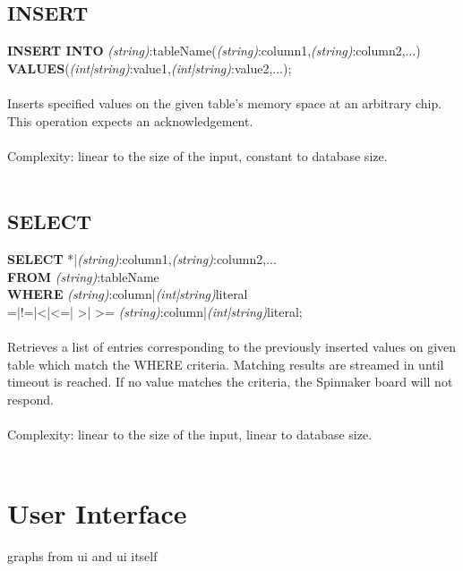 \subsection{INSERT}   
   
 \noindent
  {\large\textbf{INSERT INTO} \textit{(string)}:tableName(\textit{(string)}:column1,\textit{(string)}:column2,...)\\
  \textbf{VALUES}(\textit{(int|string)}:value1,\textit{(int|string)}:value2,...);}\\\\
\noindent
  Inserts specified values on the given table's memory space at an arbitrary chip. This operation expects an acknowledgement.\\\\
\noindent
   Complexity: linear to the size of the input, constant to database size.\\\\

\subsection{SELECT}   
   
\noindent
  {\large\textbf{SELECT} *|\textit{(string)}:column1,\textit{(string)}:column2,...\\
  \textbf{FROM} \textit{(string)}:tableName\\
  \textbf{WHERE} \textit{(string)}:column|\textit{(int|string)}literal \\=|!=|\textless |\textless =|
  \textgreater | \textgreater = \textit{(string)}:column|\textit{(int|string)}literal;}\\\\
\noindent
  Retrieves a list of entries corresponding to the previously inserted values on given table which match the WHERE criteria. Matching results are streamed in until timeout is reached. If no value matches the criteria, the Spinnaker board will not respond.\\\\
\noindent
Complexity: linear to the size of the input, linear to database size.\\\\
  
\section{User Interface} 

graphs from ui and ui itself 


